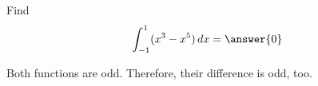 \documentclass{ximera}
\author{Gregory Hartman \and Matthew Carr\and Nela Lakos}
\begin{document}
	\begin{exercise}
		
		Find
		\[
		\int_{-1}^{1}(x^3-x^5)\d x=\answer{0}
		\]
		\begin{hint}
			Both functions are odd. Therefore, their difference is odd, too.
		\end{hint}
	\end{exercise}
\end{document}
